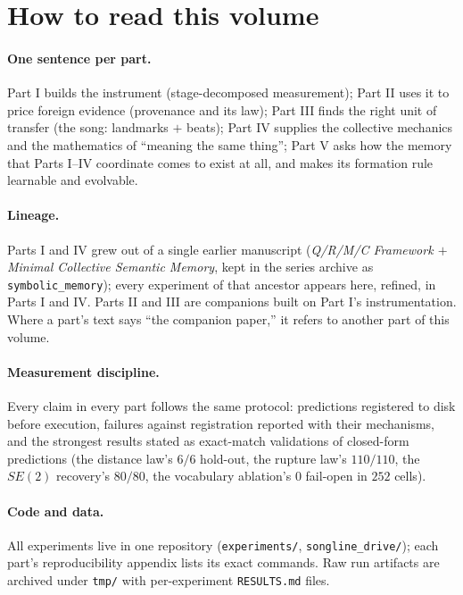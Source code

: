 \section*{How to read this volume}

\paragraph{One sentence per part.} Part I builds the instrument
(stage-decomposed measurement); Part II uses it to price foreign
evidence (provenance and its law); Part III finds the right unit of
transfer (the song: landmarks $+$ beats); Part IV supplies the
collective mechanics and the mathematics of ``meaning the same
thing''; Part V asks how the memory that Parts I--IV coordinate comes
to exist at all, and makes its formation rule learnable and evolvable.

\paragraph{Lineage.} Parts I and IV grew out of a single earlier
manuscript (\emph{Q/R/M/C Framework $+$ Minimal Collective Semantic
Memory}, kept in the series archive as \texttt{symbolic\_memory});
every experiment of that ancestor appears here, refined, in Parts I
and IV. Parts II and III are companions built on Part I's
instrumentation. Where a part's text says ``the companion paper,'' it
refers to another part of this volume.

\paragraph{Measurement discipline.} Every claim in every part follows
the same protocol: predictions registered to disk before execution,
failures against registration reported with their mechanisms, and the
strongest results stated as exact-match validations of closed-form
predictions (the distance law's $6/6$ hold-out, the rupture law's
$110/110$, the $SE(2)$ recovery's $80/80$, the vocabulary ablation's
$0$ fail-open in $252$ cells).

\paragraph{Code and data.} All experiments live in one repository
(\texttt{experiments/}, \texttt{songline\_drive/}); each part's
reproducibility appendix lists its exact commands. Raw run artifacts
are archived under \texttt{tmp/} with per-experiment
\texttt{RESULTS.md} files.
